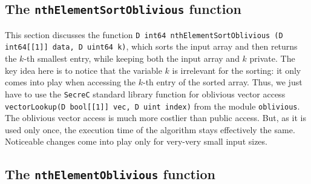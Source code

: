 \documentclass[11pt]{article}
\newcommand{\ct}[1]{\texttt{#1}}
\newcommand{\SC}{\ct{SecreC}\xspace}
\begin{document}



\subsection{The \ct{nthElementSortOblivious} function} %
\label{sub:the_nthelementsortoblivious_function}

This section discusses the function \ct{D int64 nthElementSortOblivious (D int64[[1]] data, D uint64 k)}, which sorts the input array and then returns the $k$-th smallest entry, while keeping both the input array and $k$ private. The key idea here is to notice that the variable $k$ is irrelevant for the sorting: it only comes into play when accessing the $k$-th entry of the sorted array. Thus, we just have to use the \SC standard library function for oblivious vector access \ct{vectorLookup(D bool[[1]] vec, D uint index)} from the module \ct{oblivious}. The oblivious vector access is much more costlier than public access. But, as it is used only once, the execution time of the algorithm stays effectively the same. Noticeable changes come into play only for very-very small input sizes.



\subsection{The \ct{nthElementOblivious} function} %
\label{sub:the_nthelementoblivious_function}
\end{document}
